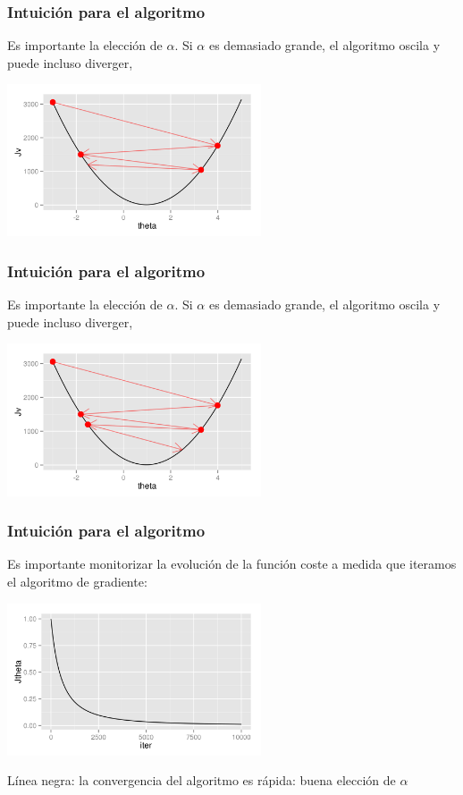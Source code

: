 \documentclass[aspectratio=169]{beamer}
\begin{document}
\begin{frame}
 \frametitle{Intuición para el algoritmo}
 \begin{overlayarea}{\textwidth}{8cm}
Es importante la elección de $\alpha$. Si $\alpha$ es demasiado grande, el algoritmo oscila y puede incluso diverger,
\begin{center}
  \includegraphics[height=4.5cm]{gradientdescent-bigalpha-5.png}
\end{center}
 \end{overlayarea}
\end{frame}

\begin{frame}
 \frametitle{Intuición para el algoritmo}
 \begin{overlayarea}{\textwidth}{8cm}
Es importante la elección de $\alpha$. Si $\alpha$ es demasiado grande, el algoritmo oscila y puede incluso diverger,
\begin{center}
  \includegraphics[height=4.5cm]{gradientdescent-bigalpha-6.png}
\end{center}
 \end{overlayarea}
\end{frame}

\begin{frame}
 \frametitle{Intuición para el algoritmo}
 \begin{overlayarea}{\textwidth}{8cm}
Es importante monitorizar la evolución de la función coste a medida que iteramos el algoritmo de gradiente:
\begin{center}
  \includegraphics[height=4.5cm]{Jiter-1.png}
\end{center}
{\scriptsize Línea negra: la convergencia del algoritmo es rápida: buena elección de $\alpha$ }
 \end{overlayarea}
\end{frame}
\end{document}
